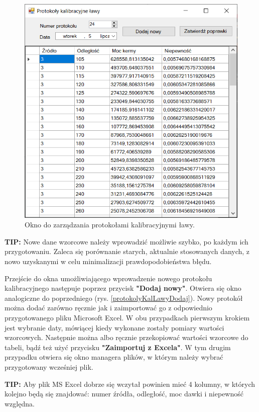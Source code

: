 \begin{figure}[H]
	\centering
	\includegraphics{obrazki/Ustawienia/protokoly_kalibracyjne_lawy.png}
	\caption{Okno do zarządzania protokołami kalibracyjnymi ławy.}
	\label{protokolyKalLawy}
\end{figure}

\textbf{TIP:} Nowe dane wzorcowe należy wprowadzić możliwie szybko, po każdym ich przygotowaniu. Zaleca się porównanie starych, aktualnie stosowanych danych, z nowo uzyskanymi w celu minimalizacji prawdopodobieństwa błędu.

Przejście do okna umożliwiającego wprowadzenie nowego protokołu kalibracyjnego następuje poprzez przycisk \textbf{"Dodaj nowy"}. Otwiera się okno analogiczne do poprzedniego (rys. \ref{protokolyKalLawyDodaj}). Nowy protokół można dodać zarówno ręcznie jak i zaimportować go z odpowiednio przygotowanego pliku Microsoft Excel. W obu przypadkach pierwszym krokiem jest wybranie daty, mówiącej kiedy wykonane zostały pomiary wartości wzorcowych. Następnie można albo ręcznie przekopiować wartości wzorcowe do tabeli, bądź też użyć przycisku \textbf{"Zaimportuj z Excela"}. W tym drugim przypadku otwiera się okno managera plików, w którym należy wybrać przygotowany wcześniej plik. 

\textbf{TIP:} Aby plik MS Excel dobrze się wczytał powinien mieć 4 kolumny, w których kolejno będą się znajdować: numer źródła, odległość, moc dawki i niepewność względna.

